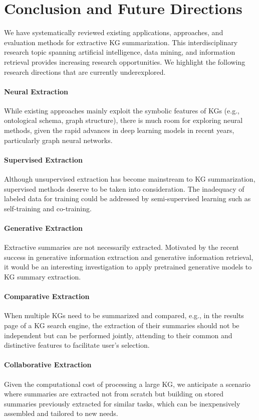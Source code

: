 \section{Conclusion and Future Directions}
\label{sec:con}

We have systematically reviewed existing applications, approaches, and evaluation methods for extractive KG summarization. This interdisciplinary research topic spanning artificial intelligence, data mining, and information retrieval provides increasing research opportunities. We highlight the following research directions that are currently underexplored.

\paragraph{Neural Extraction}
While existing approaches mainly exploit the symbolic features of KGs (e.g., ontological schema, graph structure), there is much room for exploring neural methods, given the rapid advances in deep learning models in recent years, particularly graph neural networks.

\paragraph{Supervised Extraction}
Although unsupervised extraction has become mainstream to KG summarization, supervised methods deserve to be taken into consideration. The inadequacy of labeled data for training could be addressed by semi-supervised learning such as self-training and co-training.

\paragraph{Generative Extraction}
Extractive summaries are not necessarily extracted. Motivated by the recent success in generative information extraction and generative information retrieval, it would be an interesting investigation to apply pretrained generative models to KG summary extraction.

\paragraph{Comparative Extraction}
When multiple KGs need to be summarized and compared, e.g., in the results page of a KG search engine, the extraction of their summaries should not be independent but can be performed jointly, attending to their common and distinctive features to facilitate user's selection.

\paragraph{Collaborative Extraction}
Given the computational cost of processing a large KG, we anticipate a scenario where summaries are extracted not from scratch but building on stored summaries previously extracted for similar tasks, which can be inexpensively assembled and tailored to new needs.